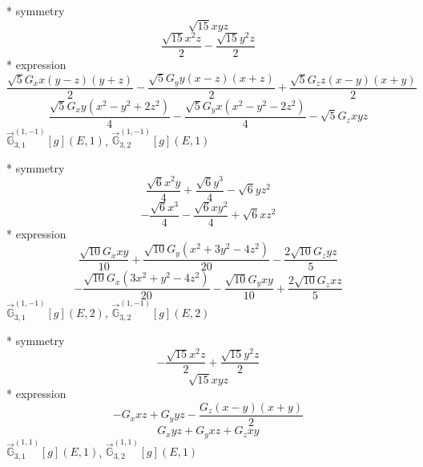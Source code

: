\documentclass[fleqn,8pt]{jsarticle}
\begin{document}
\noindent\quad ** symmetry
\begin{dmath*}
\sqrt{15} x y z
\end{dmath*}
\begin{dmath*}
\frac{\sqrt{15} x^{2} z}{2} - \frac{\sqrt{15} y^{2} z}{2}
\end{dmath*}
\noindent\quad ** expression
\begin{dmath*}
\frac{\sqrt{5} G_{x} x \left(y - z\right) \left(y + z\right)}{2} - \frac{\sqrt{5} G_{y} y \left(x - z\right) \left(x + z\right)}{2} + \frac{\sqrt{5} G_{z} z \left(x - y\right) \left(x + y\right)}{2}
\end{dmath*}
\begin{dmath*}
\frac{\sqrt{5} G_{x} y \left(x^{2} - y^{2} + 2 z^{2}\right)}{4} - \frac{\sqrt{5} G_{y} x \left(x^{2} - y^{2} - 2 z^{2}\right)}{4} - \sqrt{5} G_{z} x y z
\end{dmath*}
\noindent\quad $\vec{\mathbb{G}}_{3,1}^{(1,-1)}[g](E,1)$, $\vec{\mathbb{G}}_{3,2}^{(1,-1)}[g](E,1)$

\noindent\quad ** symmetry
\begin{dmath*}
\frac{\sqrt{6} x^{2} y}{4} + \frac{\sqrt{6} y^{3}}{4} - \sqrt{6} y z^{2}
\end{dmath*}
\begin{dmath*}
- \frac{\sqrt{6} x^{3}}{4} - \frac{\sqrt{6} x y^{2}}{4} + \sqrt{6} x z^{2}
\end{dmath*}
\noindent\quad ** expression
\begin{dmath*}
\frac{\sqrt{10} G_{x} x y}{10} + \frac{\sqrt{10} G_{y} \left(x^{2} + 3 y^{2} - 4 z^{2}\right)}{20} - \frac{2 \sqrt{10} G_{z} y z}{5}
\end{dmath*}
\begin{dmath*}
- \frac{\sqrt{10} G_{x} \left(3 x^{2} + y^{2} - 4 z^{2}\right)}{20} - \frac{\sqrt{10} G_{y} x y}{10} + \frac{2 \sqrt{10} G_{z} x z}{5}
\end{dmath*}
\noindent\quad $\vec{\mathbb{G}}_{3,1}^{(1,-1)}[g](E,2)$, $\vec{\mathbb{G}}_{3,2}^{(1,-1)}[g](E,2)$

\noindent\quad ** symmetry
\begin{dmath*}
- \frac{\sqrt{15} x^{2} z}{2} + \frac{\sqrt{15} y^{2} z}{2}
\end{dmath*}
\begin{dmath*}
\sqrt{15} x y z
\end{dmath*}
\noindent\quad ** expression
\begin{dmath*}
- G_{x} x z + G_{y} y z - \frac{G_{z} \left(x - y\right) \left(x + y\right)}{2}
\end{dmath*}
\begin{dmath*}
G_{x} y z + G_{y} x z + G_{z} x y
\end{dmath*}
\noindent\quad $\vec{\mathbb{G}}_{3,1}^{(1,1)}[g](E,1)$, $\vec{\mathbb{G}}_{3,2}^{(1,1)}[g](E,1)$
\end{document}
